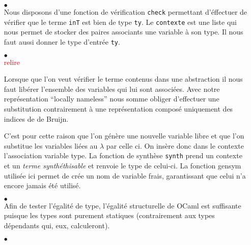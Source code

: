 \documentclass {article}
\newcommand{\codefrom}[3]
           {}
\theoremstyle{definition}
\theoremstyle{remark}
\newcommand{\todo}[1]{\textcolor{red}{#1}}
\newcommand{\fun}[1]{\lstinline!#1!}
\begin{document}
\begin{itemize}
  
\item[$\bullet$] \\
  
  Nous disposons d'une fonction de vérification \lstinline!check!
  permettant d'éffectuer de vérifier que le terme \fun{inT} est bien de type
  \fun{ty}.
  Le \fun{contexte} est une liste qui nous permet de stocker
  des paires associants une variable à son type. Il nous faut aussi
  donner le type d'entrée \fun{ty}.
    
  
  
  \codefrom{typed}{lambda}{check_def} 
  
\item[$\bullet$]  \\
  
  \todo{relire}

  Lorsque que l'on veut vérifier le terme contenus dans une abstraction il nous faut libérer l'ensemble des variables
  qui lui sont associées. Avec notre représentation ``locally nameless'' nous somme obliger d'effectuer une substitution
  contrairement à une représentation composé uniquement des indices de de Bruijn.
  
  C'est pour cette raison que l'on génère une nouvelle variable libre et que l'on substitue les variables liées 
  au $\lambda$ par celle ci. On insère donc dans le contexte l'association variable type.
  La fonction de synthèse \lstinline!synth! prend un contexte et un
  \emph{terme synthéthisable} et renvoie le type de celui-ci.
  La fonction gensym utilisée ici permet de crée un nom de variable frais, garantissant que celui n'a encore jamais
été utilisé. 
%
 \codefrom{typed}{lambda}{check_abs}

\item[$\bullet$]  \\


Afin de tester l'égalité de type, l'égalité structurelle de OCaml est
suffisante puisque les types sont purement statiques (contrairement
aux types dépendants qui, eux, calculeront).
%
\codefrom{typed}{lambda}{check_inv}
  

\item[$\bullet$] \\


\end{itemize}
\end{document}
